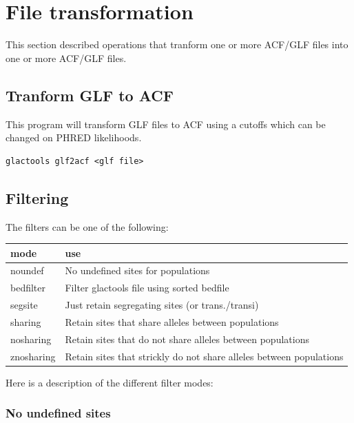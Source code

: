 \documentclass[a4paper]{article}
\begin{document}
\newpage

\section{File transformation}

This section described operations that tranform one or more ACF/GLF files into one or more ACF/GLF files.

\subsection{Tranform GLF to ACF}

This program will transform GLF files to ACF using a cutoffs which can be changed on PHRED likelihoods.
\begin{lstlisting}
glactools glf2acf <glf file>
\end{lstlisting}



\subsection{Filtering}
The filters can be one of the following:

\begin{tabular}{ll}
\hline
mode & use \\
\hline
noundef      &   No undefined sites for populations \\
bedfilter    &   Filter glactools file using sorted bedfile \\
segsite      &   Just retain segregating sites (or trans./transi) \\
sharing      &   Retain sites that share alleles between populations \\
nosharing    &   Retain sites that do not share alleles between populations \\
znosharing   &   Retain sites that strickly do not share alleles between populations \\
\end{tabular}

Here is a description of the different filter modes:

\subsubsection{No undefined sites}
\end{document}
